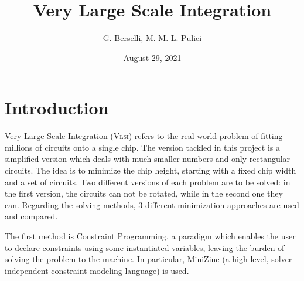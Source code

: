 \documentclass[a4paper, 12pt]{article}
\begin{document}
\title{Very Large Scale Integration}
\author{G. Berselli, M. M. L. Pulici}
\date{August 29, 2021}
\maketitle
\begin{center}
\end{center}


\clearpage


\tableofcontents


\clearpage


\listoffigures


\clearpage


\section{Introduction}

Very Large Scale Integration (\textsc{Vlsi}) refers to the real-world problem of fitting millions of circuits onto a single chip. The version tackled in this project is a simplified version which deals with much smaller numbers and only rectangular circuits. The idea is to minimize the chip height, starting with a fixed chip width and a set of circuits. Two different versions of each problem are to be solved: in the first version, the circuits can not be rotated, while in the second one they can. Regarding the solving methods, 3 different minimization approaches are used and compared.

The first method is Constraint Programming, a paradigm which enables the user to declare constraints using some instantiated variables, leaving the burden of solving the problem to the machine. In particular, MiniZinc (a high-level, solver-independent constraint modeling language) is used.
\end{document}
